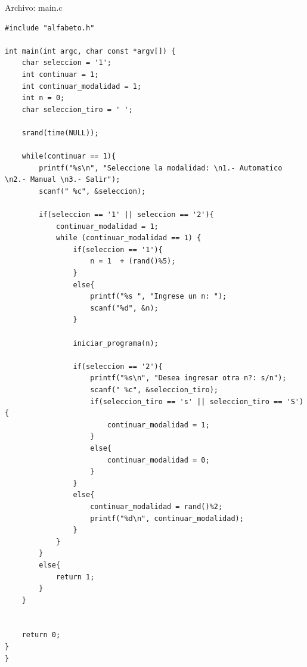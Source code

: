 \documentclass[12pt]{article}
\begin{document}
Archivo: main.c
\lstset{language=C, breaklines=true, basicstyle=\footnotesize}
\begin{lstlisting}[frame=single]
#include "alfabeto.h"

int main(int argc, char const *argv[]) {
    char seleccion = '1';
    int continuar = 1;
    int continuar_modalidad = 1;
    int n = 0;
    char seleccion_tiro = ' ';

    srand(time(NULL));

    while(continuar == 1){
        printf("%s\n", "Seleccione la modalidad: \n1.- Automatico \n2.- Manual \n3.- Salir");
        scanf(" %c", &seleccion);

        if(seleccion == '1' || seleccion == '2'){
            continuar_modalidad = 1;
            while (continuar_modalidad == 1) {
                if(seleccion == '1'){
                    n = 1  + (rand()%5);
                }
                else{
                    printf("%s ", "Ingrese un n: ");
                    scanf("%d", &n);
                }

                iniciar_programa(n);

                if(seleccion == '2'){
                    printf("%s\n", "Desea ingresar otra n?: s/n");
                    scanf(" %c", &seleccion_tiro);
                    if(seleccion_tiro == 's' || seleccion_tiro == 'S'){
                        continuar_modalidad = 1;
                    }
                    else{
                        continuar_modalidad = 0;
                    }
                }
                else{
                    continuar_modalidad = rand()%2;
                    printf("%d\n", continuar_modalidad);
                }
            }
        }
        else{
            return 1;
        }
    }


    return 0;
}
}
\end{lstlisting}
\end{document}
